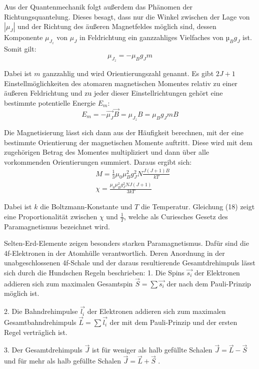 Aus der Quantenmechanik folgt außerdem das Phänomen der Richtungsquantelung. Dieses besagt, dass nur die Winkel
zwischen der Lage von $|\mu_J|$ und der Richtung des äußeren Magnetfeldes möglich sind, dessen Komponente
$\mu_{J_z}$ von $\mu_J$ in Feldrichtung ein ganzzahliges Vielfaches von $µ_B g_J$ ist. Somit gilt:
\begin{equation}
  \mu_{J_z} = - \mu_B g_J m
\end{equation}

Dabei ist $m$ ganzzahlig und wird Orientierungszahl genannt. Es gibt $2J + 1$ Einstellmöglichkeiten
des atomaren magnetischen Momentes relativ zu einer äußeren Feldrichtung und zu jeder dieser Einstellrichtungen
gehört eine bestimmte potentielle Energie $E_m$:
\begin{equation}
  E_m = - \vec{\mu_J} \vec{B} = \mu_{J_z} B = \mu_B g_J m B
\end{equation}

Die Magnetisierung lässt sich dann aus der Häufigkeit berechnen, mit der eine bestimmte Orientierung
der magnetischen Momente auftritt. Diese wird mit  dem
zugehörigen Betrag des Momentes multipliziert und dann über alle vorkommenden
Orientierungen summiert. Daraus ergibt sich:
\begin{align}
  &M = \frac{1}{3} \mu_0 \mu_B^2 g_J^2 N \frac{J(J+1)B}{kT} \\
  &\chi = \frac{\mu_0 \mu_B^2 g_J^2 N J(J+1)}{3kT}
\end{align}

Dabei ist $k$ die Boltzmann-Konstante und $T$ die Temperatur. Gleichung (18) zeigt eine
Proportionalität zwischen $\chi$ und $\frac{1}{T}$, welche als Curiesches Gesetz des Paramagnetismus bezeichnet wird.

Selten-Erd-Elemente zeigen besonders starken Paramagnetismus. Dafür sind die 4f-Elektronen in der Atomhülle
verantwortlich. Deren Anordnung in der unabgeschlossenen 4f-Schale und der daraus resultierende Gesamtdrehimpuls
lässt sich durch die Hundschen Regeln beschrieben:
1. Die Spins $\vec{s_i}$ der Elektronen addieren sich zum maximalen Gesamtspin $\vec{S} = \sum \vec{s_i}$ der nach dem Pauli-Prinzip möglich ist.

2. Die Bahndrehimpulse $\vec{l_i}$ der Elektronen addieren sich zum maximalen Gesamtbahndrehimpuls $\vec{L} = \sum \vec{l_i}$ der mit
dem Pauli-Prinzip und der ersten Regel verträglich ist.

3. Der Gesamtdrehimpuls $\vec{J}$ ist für weniger als halb gefüllte Schalen $\vec{J} = \vec{L}- \vec{S}$ und für mehr als halb gefüllte Schalen
$\vec{J} = \vec{L} + \vec{S}$ .


